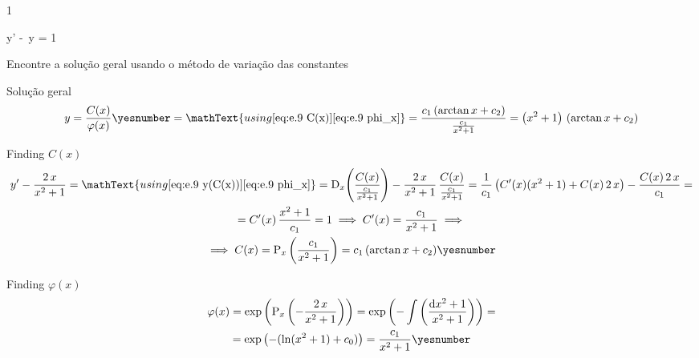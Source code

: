 \documentclass["AM3C-Slides_annotations.tex"]{subfiles}
\begin{document}
\begin{exampleBox}1{} %

  \begin{BM}
    y' - \,y = 1
  \end{BM}
  Encontre a solução geral usando o método de variação das constantes
  
  \answer{}

  Solução geral
  \begin{gather*}
    y
    = \frac{C(x)}{\varphi(x)}
    \yesnumber\label{eq:e.9 y(C(x))}
    = \mathText{using
      \eqref{eq:e.9 C(x)}
      \eqref{eq:e.9 phi_x}
    }
    = \frac{
      c_1\,(
      \arctan{x}+c_2
    )    
    }{
      \frac{c_1}{x^2+1}
    }
    = \left(x^2+1\right)
    \,\left(
      \arctan{x}
      + c_2
    \right)
  \end{gather*}

  Finding \(C(x)\)
  \begin{gather*}
    y'-\frac{2\,x}{x^2+1}
    = \mathText{using 
      \eqref{eq:e.9 y(C(x))}
      \eqref{eq:e.9 phi_x}
    }
    = \mdif{x}{\left(
        \frac{C(x)}{\frac{c_1}{x^2+1}}
    \right)}
    - \frac{2\,x}{x^2+1}
    \,\frac{C(x)}{\frac{c_1}{x^2+1}}
    = \frac{1}{c_1}\left(
      C'(x)
      (x^2+1)
      + C(x)\,2\,x
    \right)
    - \frac{C(x)\,2\,x}{c_1}
    = \\
    = C'(x)\,\frac{x^2+1}{c_1}
    = 1
    \implies
    C'(x) 
    = \frac{c_1}{x^2+1}
    \implies \\
    \implies
    C(x)
    = \prim_x{\left(
      \frac{c_1}{x^2+1}
    \right)}
    = c_1\,(
      \arctan{x}+c_2
    )    
    \yesnumber\label{eq:e.9 C(x)}
  \end{gather*}

  Finding \(\varphi(x)\)
  \begin{gather*}
    \varphi(x)
    = \exp{\left(
        \prim_x{\left(
            -\frac{2\,x}{x^2+1}
        \right)}
    \right)}
    = \exp{\left(
        -\int{\left(
            \frac{\odif{x^2+1}}{x^2+1}
        \right)}
    \right)}
    = \\
    = \exp{\left(
        -(
          \ln(x^2+1)+c_0
        )
    \right)}
    = 
    \frac{c_1}{x^2+1}
    \yesnumber\label{eq:e.9 phi_x}
  \end{gather*}


  \answer{\eqref{eq:9.2 answer}}



\end{exampleBox}
\end{document}
